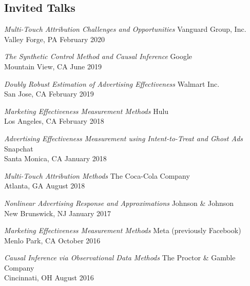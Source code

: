 
\subsection{{Invited Talks}}
\begin{zitemize}
\item \textit{Multi-Touch Attribution Challenges and Opportunities} \hfill Vanguard Group, Inc. \\
Valley Forge, PA \hfill February 2020
\vspace{0.2em}
\item \textit{The Synthetic Control Method and Causal Inference} \hfill Google \\
Mountain View, CA \hfill June 2019
\vspace{0.2em}
\item \textit{Doubly Robust Estimation of Advertising Effectiveness} \hfill Walmart Inc. \\ 
San Jose, CA \hfill February 2019
\vspace{0.2em}
\item \textit{Marketing Effectiveness Measurement Methods} \hfill Hulu  \\
Los Angeles, CA \hfill February 2018
\vspace{0.2em}
\item \textit{Advertising Effectiveness Measurement using Intent-to-Treat and Ghost Ads} \hfill Snapchat \\
Santa Monica, CA \hfill January 2018
\vspace{0.2em}
\item \textit{Multi-Touch Attribution Methods} \hfill The Coca-Cola Company \\
Atlanta, GA \hfill August 2018
\vspace{0.2em}
\item \textit{Nonlinear Advertising Response and Approximations} \hfill Johnson \& Johnson \\
New Brunswick, NJ \hfill January 2017
\vspace{0.2em}
\item \textit{Marketing Effectiveness Measurement Methods} \hfill Meta (previously Facebook) \\
Menlo Park, CA \hfill October 2016 
\vspace{0.2em}
\item \textit{Causal Inference via Observational Data Methods} \hfill The Proctor \& Gamble Company \\
Cincinnati, OH \hfill August 2016


\end{zitemize}
